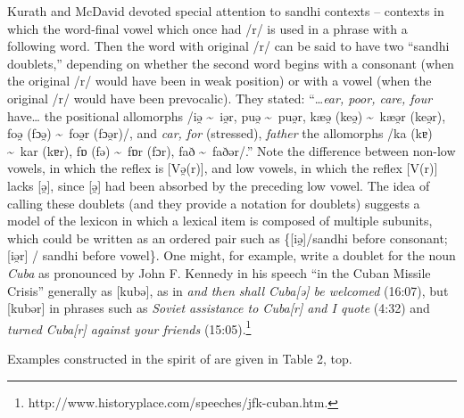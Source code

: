 \documentclass[output=paper,
modfonts
]{LSP/langsci}
\begin{document}
Kurath and McDavid devoted special attention to sandhi
contexts -- contexts in which the word-final vowel which once had /r/ is
used in a phrase with a following word. Then the word with original /r/
can be said to have two ``sandhi doublets,'' depending on whether the
second word begins with a consonant (when the original /r/ would have
been in weak position) or with a vowel (when the original /r/ would have
been prevocalic). They stated: ``\ldots{}\emph{ear, poor, care, four}
have\ldots{} the positional allomorphs /iə̯ \textasciitilde\ iə̯r, puə̯ \textasciitilde\ puə̯r, kæə̯ (keə̯) \textasciitilde\ kæə̯r (keə̯r), foə̯ (fɔə̯) 
\textasciitilde\ foə̯r (fɔə̯r)/, and \textit{car, for} (stressed), \textit{father} 
the allomorphs /ka (kɐ) \textasciitilde\ kar (kɐr), fɒ (fə) \textasciitilde\ fɒr (fɔr), fað \textasciitilde\ faðər/.'' Note
the difference between non-low vowels, in which the reflex is
{[}Və̯(r){]}, and low vowels, in which the reflex {[}V(r){]} lacks
{[}ə̯{]}, since {[}ə̯{]} had been absorbed by the preceding low vowel. The
idea of calling these doublets (and they provide a notation for
doublets) suggests a model of the lexicon in which a lexical item is
composed of multiple subunits, which could be written as an ordered pair
such as \{{[}iə̯{]}/sandhi before consonant; {[}iə̯r{]} / sandhi before
vowel\}. One might, for example, write a doublet for the noun
\emph{Cuba} as pronounced by John F. Kennedy in his speech ``in the
Cuban Missile Crisis'' generally as {[}kubə{]}, as in \emph{and then
shall Cuba{[}ə{]} be welcomed} (16:07), but {[}kubər{]} in phrases such
as \emph{Soviet assistance to Cuba{[}r{]} and I quote} (4:32) and
\emph{turned Cuba{[}r{]} against your friends} (15:05).\footnote{http://www.historyplace.com/speeches/jfk-cuban.htm.}

Examples constructed in the spirit of \citet{KUR} are given in
Table 2, top.
\end{document}
